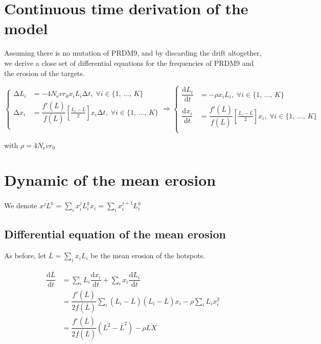 \documentclass{article}
\begin{document}
\section{Continuous time derivation of the model}
Assuming there is no mutation of PRDM9, and by discarding the drift altogether, we derive a close set of differential equations for the frequencies of PRDM9 and the erosion of the targets.

\begin{equation}
  \left\{
      \begin{aligned}
        \mathrm{\Delta}L_i &= 
        - 4 N_\mathrm{e} v r _0  x_i L_i \mathrm{\Delta}t, \;
             \forall i \in \{ 1, \, \dots, \, K \} \\
        \mathrm{\Delta}x_i &= \dfrac{f'(\overline{L})}{f(\overline{L})} \left[ \tfrac{L_i - \overline{L}}{2} \right]x_i  \mathrm{\Delta}t , \;
         \forall i \in \{ 1, \, \dots, \, K \}\\
      \end{aligned}
    \right.
 \Rightarrow
  \left\{
      \begin{aligned}
        \dfrac{\mathrm{d}L_i}{\mathrm{d}t} &= 
        - \rho  x_i L_i, \;
             \forall i \in \{ 1, \, \dots, \, K \} \\
        \dfrac{\mathrm{d}x_i}{\mathrm{d}t} &= \dfrac{f'(\overline{L})}{f(\overline{L})} \left[ \tfrac{L_i - \overline{L}}{2} \right]x_i , \;
         \forall i \in \{ 1, \, \dots, \, K \}\\
      \end{aligned}
    \right.
\end{equation}

with $\rho = 4 N_\mathrm{e} v r _0$

\section{Dynamic of the mean erosion}
We denote $\overline{x^{j} L^{k}}=\sum_i x_i^{j} L_i^{k} x_i =\sum_i x_i^{j+1} L_i^{k}$

\subsection{Differential equation of the mean erosion}
As before, let $\overline{L}=\sum_i x_i L_i$ be the mean erosion of the hotspots.

\begin{equation}
  \begin{aligned}
    \dfrac{\mathrm{d} \overline{L} }{\mathrm{d}t} &=
    \sum_i L_i \dfrac{\mathrm{d}x_i}{\mathrm{d}t} +  \sum_i x_i \dfrac{\mathrm{d}L_i}{\mathrm{d}t} \\
    &=
    \dfrac{f'(\overline{L})}{2 f(\overline{L})} \sum_i (L_i - \overline{L}) (L_i - \overline{L}) x_i - \rho \sum_i L_i x_i^2\\
    &=
    \dfrac{f'(\overline{L})}{2 f(\overline{L})} (\overline{L^2} - \overline{L}^2) - \rho \overline{L X}\\
  \end{aligned}
\end{equation}
\end{document}
